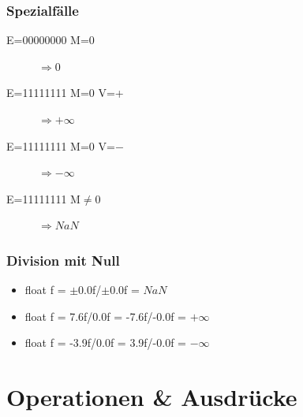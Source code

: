 \documentclass[a4paper,10pt]{article}
\begin{document}
\subsubsection{Spezialf\"alle}
\begin{description}
	\item[E=00000000 M=0] $\Rightarrow 0$
	\item[E=11111111 M=0 V=+] $\Rightarrow +\infty$
	\item[E=11111111 M=0 V=$-$] $\Rightarrow -\infty$
	\item[E=11111111 M$\neq$0] $\Rightarrow NaN$
\end{description}

\subsubsection{Division mit Null}
\begin{itemize}
	\item float f = $\pm$0.0f/$\pm$0.0f = $NaN$
	\item float f = 7.6f/0.0f = -7.6f/-0.0f = $+\infty$
	\item float f = -3.9f/0.0f = 3.9f/-0.0f = $-\infty$
\end{itemize}

\newpage
\section{Operationen \& Ausdr\"ucke}
\end{document}
